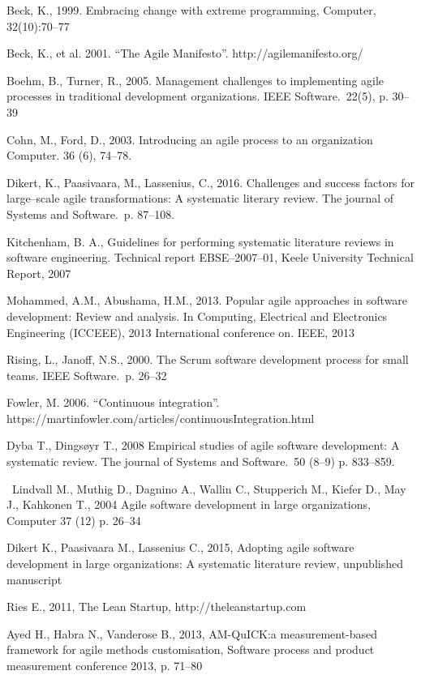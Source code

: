 \noindent [1] Beck, K., 1999. Embracing change with extreme programming, Computer,
32(10):70–77

\noindent [2] Beck, K., et al. 2001. ``The Agile Manifesto''.
http://agilemanifesto.org/

\noindent [3] Boehm, B., Turner, R., 2005. Management challenges to implementing agile
processes in traditional development organizations. IEEE Software.\ 22(5), p. 30–39

\noindent [4] Cohn, M., Ford, D., 2003. Introducing an agile process to an
organization Computer. 36 (6), 74–78.

\noindent [5] Dikert, K., Paasivaara, M., Lassenius, C., 2016. Challenges and success factors
for large–scale agile transformations: A systematic literary review. The journal
of Systems and Software.\ p. 87–108.

\noindent [6] Kitchenham, B. A., Guidelines for performing systematic literature
reviews in software engineering. Technical report EBSE–2007–01, Keele University
Technical Report, 2007

\noindent [7] Mohammed, A.M., Abushama, H.M., 2013. Popular agile approaches in software
development: Review and analysis. In Computing, Electrical and Electronics
Engineering (ICCEEE), 2013 International conference on. IEEE, 2013

\noindent [8] Rising, L., Janoff, N.S., 2000. The Scrum software development process for small teams. IEEE Software.\ p. 26–32

\noindent [9] Fowler, M. 2006. ``Continuous integration''.
https://martinfowler.com/articles/continuousIntegration.html

\noindent [10] Dyba T., Dingsøyr T., 2008 Empirical studies of agile
software development: A systematic review. The journal of Systems and
Software.\ 50 (8–9) p. 833–859.

\noindent [11] Lindvall M., Muthig D., Dagnino A., Wallin C.,
Stupperich M., Kiefer D., May J., Kahkonen T., 2004
Agile software development in large organizations, Computer 37 (12) p. 26–34

\noindent [12] Dikert K., Paasivaara M., Lassenius C., 2015, Adopting agile software development in large organizations: A systematic literature review, unpublished manuscript

\noindent [13] Ries E., 2011, The Lean Startup, http://theleanstartup.com

\noindent [14] Ayed H., Habra N., Vanderose B., 2013, AM-QuICK:\@ a
measurement-based framework for agile methods customisation, Software process
and product measurement conference 2013, p. 71–80

